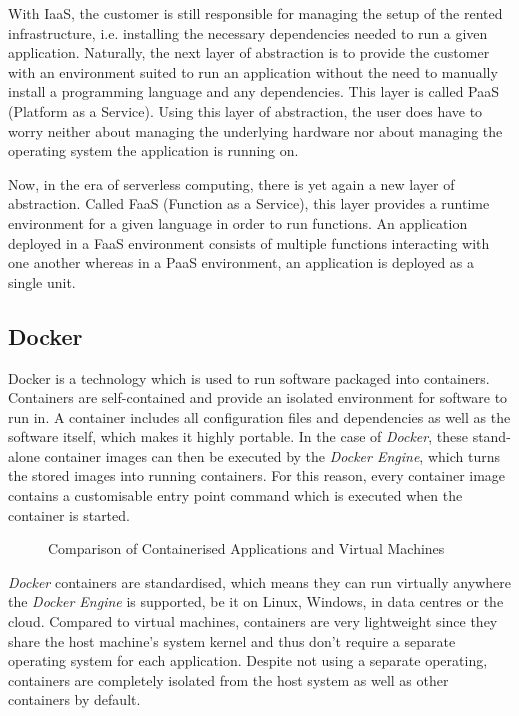 With IaaS, the customer is still responsible for managing the setup of the rented infrastructure,
i.e. installing the necessary dependencies needed to run a given application. Naturally, the next
layer of abstraction is to provide the customer with an environment suited to run an application
without the need to manually install a programming language and any dependencies. This layer is
called PaaS (Platform as a Service). Using this layer of abstraction, the user does have to worry
neither about managing the underlying hardware nor about managing the operating system the
application is running on.

Now, in the era of serverless computing, there is yet again a new layer of abstraction. Called FaaS
(Function as a Service), this layer provides a runtime environment for a given language in order to
run functions. An application deployed in a FaaS environment consists of multiple functions
interacting with one another whereas in a PaaS environment, an application is deployed as a single
unit.

\subsection{Docker}

Docker is a technology which is used to run software packaged into containers. Containers are
self-contained and provide an isolated environment for software to run in. A container includes all
configuration files and dependencies as well as the software itself, which makes it highly portable.
In the case of \textit{Docker}, these stand-alone container images can then be executed by the
\textit{Docker Engine}, which turns the stored images into running containers. For this reason,
every container image contains a customisable entry point command which is executed when the
container is started.

\begin{figure}[H]
  \centering
  \caption{Comparison of Containerised Applications and Virtual Machines \cite{docker-container}}
\end{figure}

\textit{Docker} containers are standardised, which means they can run virtually anywhere the
\textit{Docker Engine} is supported, be it on Linux, Windows, in data centres or the cloud. Compared
to virtual machines, containers are very lightweight since they share the host machine's system
kernel and thus don't require a separate operating system for each application. Despite not using a
separate operating, containers are completely isolated from the host system as well as other
containers by default.

